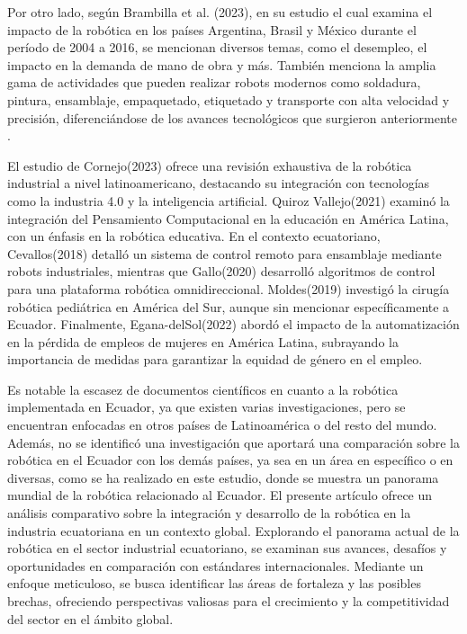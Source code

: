 \documentclass[conference]{IEEEtran}
\begin{document}
Por otro lado, según Brambilla et al. (2023), en su estudio el cual examina el impacto de la robótica en los países Argentina, Brasil y México durante el período de 2004 a 2016, se mencionan diversos temas, como el desempleo, el impacto en la demanda de mano de obra y más. También menciona la amplia gama de actividades que pueden realizar robots modernos como soldadura, pintura, ensamblaje, empaquetado, etiquetado y transporte con alta velocidad y precisión, diferenciándose de los avances tecnológicos que surgieron anteriormente\cite{Brambilla2023} .

El estudio de Cornejo(2023) ofrece una revisión exhaustiva de la robótica industrial a nivel latinoamericano, destacando su integración con tecnologías como la industria 4.0 y la inteligencia artificial. Quiroz Vallejo(2021) examinó la integración del Pensamiento Computacional en la educación en América Latina, con un énfasis en la robótica educativa. En el contexto ecuatoriano, Cevallos(2018) detalló un sistema de control remoto para ensamblaje mediante robots industriales, mientras que Gallo(2020) desarrolló algoritmos de control para una plataforma robótica omnidireccional. Moldes(2019) investigó la cirugía robótica pediátrica en América del Sur, aunque sin mencionar específicamente a Ecuador. Finalmente, Egana-delSol(2022) abordó el impacto de la automatización en la pérdida de empleos de mujeres en América Latina, subrayando la importancia de medidas para garantizar la equidad de género en el empleo.

Es notable la escasez de documentos científicos en cuanto a la robótica implementada en Ecuador, ya que existen varias investigaciones, pero se encuentran enfocadas en otros países de Latinoamérica o del resto del mundo. Además, no se identificó una investigación que aportará una comparación sobre la robótica en el Ecuador con los demás países, ya sea en un área en específico o en diversas, como se ha realizado en este estudio, donde se muestra un panorama mundial de la robótica relacionado al Ecuador. El presente artículo ofrece un análisis comparativo sobre la integración y desarrollo de la robótica en la industria ecuatoriana en un contexto global. Explorando el panorama actual de la robótica en el sector industrial ecuatoriano, se examinan sus avances, desafíos y oportunidades en comparación con estándares internacionales. Mediante un enfoque meticuloso, se busca identificar las áreas de fortaleza y las posibles brechas, ofreciendo perspectivas valiosas para el crecimiento y la competitividad del sector en el ámbito global.
\end{document}
